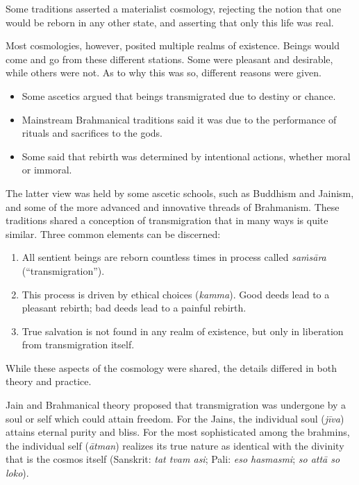\documentclass[12pt,openany]{book}%
\begin{document}
Some traditions asserted a materialist cosmology, rejecting the notion that one would be reborn in any other state, and asserting that only this life was real.

Most cosmologies, however, posited multiple realms of existence. Beings would come and go from these different stations. Some were pleasant and desirable, while others were not. As to why this was so, different reasons were given.

\begin{itemize}%
\item Some ascetics argued that beings transmigrated due to destiny or chance.%
\item Mainstream Brahmanical traditions said it was due to the performance of rituals and sacrifices to the gods.%
\item Some said that rebirth was determined by intentional actions, whether moral or immoral.%
\end{itemize}

The latter view was held by some ascetic schools, such as Buddhism and Jainism, and some of the more advanced and innovative threads of Brahmanism. These traditions shared a conception of transmigration that in many ways is quite similar. Three common elements can be discerned:

\begin{enumerate}%
\item All sentient beings are reborn countless times in process called \textit{\textsanskrit{saṁsāra}} (“transmigration”).%
\item This process is driven by ethical choices (\textit{kamma}). Good deeds lead to a pleasant rebirth; bad deeds lead to a painful rebirth.%
\item True salvation is not found in any realm of existence, but only in liberation from transmigration itself.%
\end{enumerate}

While these aspects of the cosmology were shared, the details differed in both theory and practice.

Jain and Brahmanical theory proposed that transmigration was undergone by a soul or self which could attain freedom. For the Jains, the individual soul (\textit{\textsanskrit{jīva}}) attains eternal purity and bliss. For the most sophisticated among the brahmins, the individual self (\textit{\textsanskrit{ātman}}) realizes its true nature as identical with the divinity that is the cosmos itself (Sanskrit: \textit{tat tvam asi}; Pali: \textit{eso hasmasmi}; \textit{so \textsanskrit{attā} so loko}).
\end{document}
